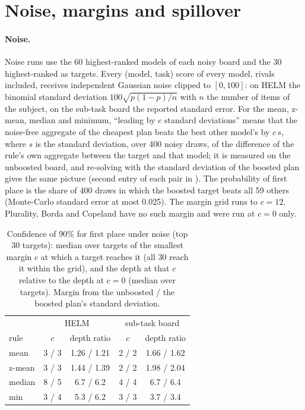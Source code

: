 \section{Noise, margins and spillover}
\label{app:e6e7}

\paragraph{Noise.}
Noise runs use the 60 highest-ranked models of each noisy board and the 30 highest-ranked as targets. Every (model, task) score of every model, rivals included, receives independent Gaussian noise clipped to $[0,100]$: on HELM the binomial standard deviation $100\sqrt{p(1-p)/n}$ with $n$ the number of items of the subject, on the sub-task board the reported standard error. For the mean, z-mean, median and minimum, ``leading by $c$ standard deviations'' means that the noise-free aggregate of the cheapest plan beats the best other model's by $c\,s$, where $s$ is the standard deviation, over 400 noisy draws, of the difference of the rule's own aggregate between the target and that model; it is measured on the unboosted board, and re-solving with the standard deviation of the boosted plan gives the same picture (second entry of each pair in ). The probability of first place is the share of 400 draws in which the boosted target beats all 59 others (Monte-Carlo standard error at most 0.025). The margin grid runs to $c=12$. Plurality, Borda and Copeland have no such margin and were run at $c=0$ only.

\begin{table}[h]
\centering
\caption{Confidence of 90\% for first place under noise (top 30 targets): median over targets of the smallest margin $c$ at which a target reaches it (all 30 reach it within the grid), and the depth at that $c$ relative to the depth at $c=0$ (median over targets). Margin from the unboosted / the boosted plan's standard deviation.}
\label{tab:noise}
\small
\begin{tabular}{lcccc}
\toprule
 & \multicolumn{2}{c}{HELM} & \multicolumn{2}{c}{sub-task board} \\
rule & $c$ & depth ratio & $c$ & depth ratio \\
\midrule
mean & 3 / 3 & 1.26 / 1.21 & 2 / 2 & 1.66 / 1.62 \\
z-mean & 3 / 3 & 1.44 / 1.39 & 2 / 2 & 1.98 / 2.04 \\
median & 8 / 5 & 6.7 / 6.2 & 4 / 4 & 6.7 / 6.4 \\
min & 3 / 4 & 5.3 / 6.2 & 3 / 3 & 3.7 / 3.4 \\
\bottomrule
\end{tabular}
\end{table}

